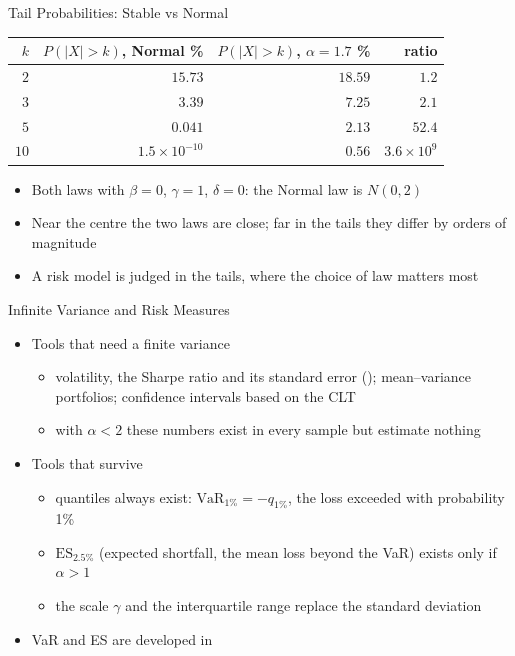 \begin{frame}{Tail Probabilities: Stable vs Normal}
\itemsize{\small}
\begin{center}
\footnotesize
\begin{tabular}{rrrr}
\toprule
$k$ & $P(|X| > k)$, Normal \% & $P(|X| > k)$, $\alpha = 1.7$ \% & ratio \\
\midrule
$2$ & $15.73$ & $18.59$ & $1.2$ \\
$3$ & $3.39$ & $7.25$ & $2.1$ \\
$5$ & $0.041$ & $2.13$ & $52.4$ \\
$10$ & $1.5\times 10^{-10}$ & $0.56$ & $3.6\times 10^{9}$ \\
\bottomrule
\end{tabular}
\end{center}
\begin{itemize}
    \item Both laws with $\beta = 0$, $\gamma = 1$, $\delta = 0$: the Normal law is $N(0, 2)$
    \item Near the centre the two laws are close; far in the tails they differ by orders of magnitude
    \item A risk model is judged in the tails, where the choice of law matters most
\end{itemize}
\end{frame}

\begin{frame}{Infinite Variance and Risk Measures}
\itemsize{\small}
\begin{itemize}
    \item Tools that need a finite variance
    \begin{itemize}
        \item volatility, the Sharpe ratio and its standard error (); mean--variance portfolios; confidence intervals based on the CLT
        \item with $\alpha < 2$ these numbers exist in every sample but estimate nothing
    \end{itemize}
    \item Tools that survive
    \begin{itemize}
        \item quantiles always exist: $\mathrm{VaR}_{1\%} = -q_{1\%}$, the loss exceeded with probability 1\%
        \item $\mathrm{ES}_{2.5\%}$ (expected shortfall, the mean loss beyond the VaR) exists only if $\alpha > 1$
        \item the scale $\gamma$ and the interquartile range replace the standard deviation
    \end{itemize}
    \item VaR and ES are developed in 
\end{itemize}
\end{frame}

